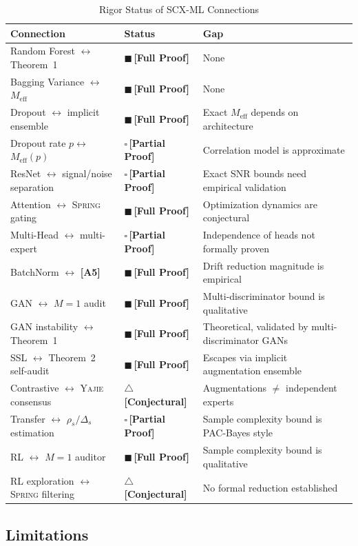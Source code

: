 \documentclass[12pt,a4paper]{article}
\theoremstyle{definition}
\newcommand{\rigorFull}{{\color{rigorcolor}$\blacksquare$\,\textbf{[Full Proof]}}}
\newcommand{\rigorPartial}{{\color{rigorcolor}$\square$\,\textbf{[Partial Proof]}}}
\newcommand{\rigorConjectural}{{\color{red!70!black}$\triangle$\,\textbf{[Conjectural]}}}
\newcommand{\Yajie}{\textsc{Yajie}}
\newcommand{\Spring}{\textsc{Spring}}
\newcommand{\asmTag}[1]{\textsf{\textbf{[A#1]}}}
\begin{document}
\begin{table}[h]
\centering
\caption{Rigor Status of SCX-ML Connections}
\label{tab:rigor_status}
\begin{tabular}{@{}lll@{}}
\toprule
\textbf{Connection} & \textbf{Status} & \textbf{Gap} \\
\midrule
Random Forest $\leftrightarrow$ Theorem~1 & \rigorFull & None \\
Bagging Variance $\leftrightarrow$ $M_{\text{eff}}$ & \rigorFull & None \\
Dropout $\leftrightarrow$ implicit ensemble & \rigorFull & Exact $M_{\text{eff}}$ depends on architecture \\
Dropout rate $p \leftrightarrow$ $M_{\text{eff}}(p)$ & \rigorPartial & Correlation model is approximate \\
ResNet $\leftrightarrow$ signal/noise separation & \rigorPartial & Exact SNR bounds need empirical validation \\
Attention $\leftrightarrow$ \Spring{} gating & \rigorFull & Optimization dynamics are conjectural \\
Multi-Head $\leftrightarrow$ multi-expert & \rigorPartial & Independence of heads not formally proven \\
BatchNorm $\leftrightarrow$ \asmTag{5} & \rigorFull & Drift reduction magnitude is empirical \\
GAN $\leftrightarrow$ $M=1$ audit & \rigorFull & Multi-discriminator bound is qualitative \\
GAN instability $\leftrightarrow$ Theorem~1 & \rigorFull & Theoretical, validated by multi-discriminator GANs \\
SSL $\leftrightarrow$ Theorem~2 self-audit & \rigorFull & Escapes via implicit augmentation ensemble \\
Contrastive $\leftrightarrow$ \Yajie{} consensus & \rigorConjectural & Augmentations $\neq$ independent experts \\
Transfer $\leftrightarrow$ $\rho_s/\Delta_s$ estimation & \rigorPartial & Sample complexity bound is PAC-Bayes style \\
RL $\leftrightarrow$ $M=1$ auditor & \rigorFull & Sample complexity bound is qualitative \\
RL exploration $\leftrightarrow$ \Spring{} filtering & \rigorConjectural & No formal reduction established \\
\bottomrule
\end{tabular}
\end{table}

\subsection{Limitations}
\end{document}
